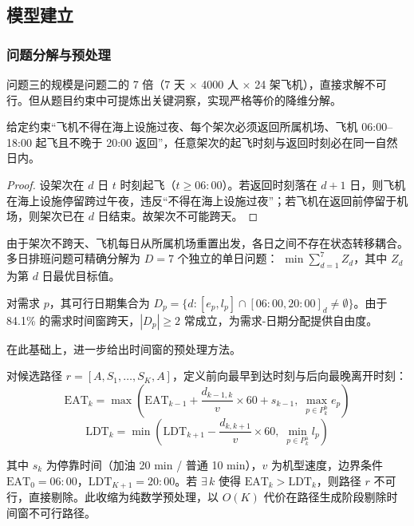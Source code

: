 
\subsection{模型建立}

\subsubsection{问题分解与预处理}

问题三的规模是问题二的 7 倍（7 天 $\times$ 4000 人 $\times$ 24 架飞机），直接求解不可行。但从题目约束中可提炼出关键洞察，实现严格等价的降维分解。

\begin{theorem}
\label{thm:decouple}
给定约束``飞机不得在海上设施过夜、每个架次必须返回所属机场、飞机 06:00--18:00 起飞且不晚于 20:00 返回''，任意架次的起飞时刻与返回时刻必在同一自然日内。
\end{theorem}

\begin{proof}
设架次在 $d$ 日 $t$ 时刻起飞（$t \geq 06{:}00$）。若返回时刻落在 $d+1$ 日，则飞机在海上设施停留跨过午夜，违反``不得在海上设施过夜''；若飞机在返回前停留于机场，则架次已在 $d$ 日结束。故架次不可能跨天。
\end{proof}

\begin{corollary}
\label{cor:indep}
由于架次不跨天、飞机每日从所属机场重置出发，各日之间不存在状态转移耦合。多日排班问题可精确分解为 $D = 7$ 个独立的单日问题：
$\min \sum_{d=1}^{7} Z_d$，其中 $Z_d$ 为第 $d$ 日最优目标值。
\end{corollary}

\begin{corollary}
\label{cor:dateset}
对需求 $p$，其可行日期集合为 $D_p = \{ d : [e_p, l_p] \cap [06{:}00, 20{:}00]_d \neq \emptyset \}$。由于 84.1\% 的需求时间窗跨天，$|D_p| \geq 2$ 常成立，为需求-日期分配提供自由度。
\end{corollary}

在此基础上，进一步给出时间窗的预处理方法。

\begin{proposition}
\label{prop:cpm}
对候选路径 $r = [A, S_1, \ldots, S_K, A]$，定义前向最早到达时刻与后向最晚离开时刻：
\begin{equation}
\text{EAT}_k = \max\!\left(\text{EAT}_{k-1} + \frac{d_{k-1,k}}{v} \times 60 + s_{k-1},\; \max_{p \in P_k^{\mathrm{b}}} e_p\right)
\label{eq:eat}
\end{equation}
\begin{equation}
\text{LDT}_k = \min\!\left(\text{LDT}_{k+1} - \frac{d_{k,k+1}}{v} \times 60,\; \min_{p \in P_k^{\mathrm{a}}} l_p\right)
\label{eq:ldt}
\end{equation}

其中 $s_k$ 为停靠时间（加油 20 min / 普通 10 min），$v$ 为机型速度，边界条件 $\text{EAT}_0 = 06{:}00$，$\text{LDT}_{K+1} = 20{:}00$。若 $\exists\, k$ 使得 $\text{EAT}_k > \text{LDT}_k$，则路径 $r$ 不可行，直接剔除。此收缩为纯数学预处理，以 $O(K)$ 代价在路径生成阶段剔除时间窗不可行路径。
\end{proposition}

